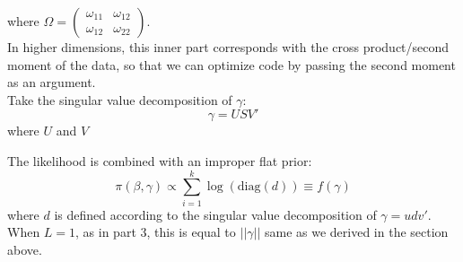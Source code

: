 \documentclass{article}
\begin{document}
where $\Omega = \begin{pmatrix} \omega_{11} & \omega_{12} \\ \omega_{12} & \omega_{22} \end{pmatrix}$.  
\\

In higher dimensions, this inner part corresponds with the cross product/second moment of the data, so that we can optimize code by passing the second moment as an argument.  
\\

Take the singular value decomposition of $\gamma$:
\[ \gamma = U S V' \]
where $U$ and $V$ 

The likelihood is combined with an improper flat prior:
\[
\pi(\beta, \gamma) \propto \sum_{i=1}^{k} \log(\text{diag}(d)) \equiv f(\gamma)
\]
where $d$ is defined according to the singular value decomposition of $\gamma = u d v'$.  When $L =1$, as in part 3, this is equal to $||\gamma ||$ same as we derived in the section above. 
\end{document}
